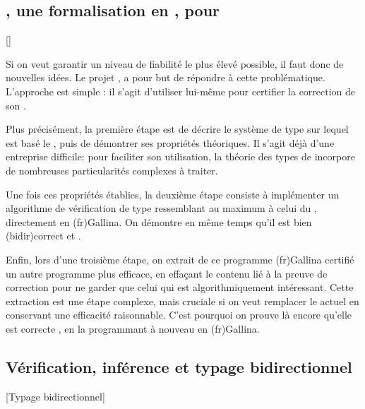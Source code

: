 \subsection{, une formalisation en , pour }[]
\label{sec:intro-metacoq-en}


Si on veut garantir un niveau de fiabilité le plus élevé possible, il faut donc de nouvelles idées.
Le projet , a pour but de répondre à cette problématique.
L’approche est simple : il s’agit d’utiliser  lui-même pour certifier la correction de son .

Plus précisément, la première étape est de décrire le système de type sur lequel est basé le , puis de démontrer ses propriétés théoriques.
Il s’agit déjà d’une entreprise difficile: pour faciliter son utilisation, la théorie
des types de  incorpore de nombreuses particularités complexes à traiter.

Une fois ces propriétés établies, la deuxième étape
consiste à implémenter un algorithme de vérification de type ressemblant au maximum à celui
du , directement en \kl(fr){Gallina}.
On démontre en même temps qu’il est bien \reintro(bidir){correct}%
et .%

Enfin, lors d’une troisième étape, on extrait de ce programme \kl(fr){Gallina} certifié
un autre programme plus efficace, en effaçant le contenu lié à la preuve de correction
pour ne garder que celui qui est algorithmiquement intéressant.
Cette extraction est une étape complexe,
mais cruciale si on veut remplacer le  actuel en conservant une
efficacité raisonnable.
C’est pourquoi on prouve là encore qu’elle est correcte%
,
en la programmant à nouveau en \kl(fr){Gallina}.

\subsection{Vérification, inférence et typage bidirectionnel}[Typage bidirectionnel]

